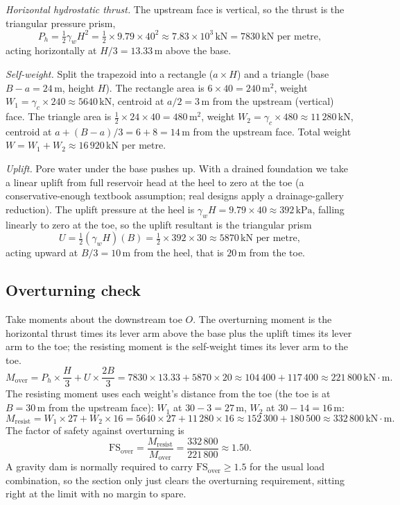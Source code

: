 \emph{Horizontal hydrostatic thrust.} The upstream face is vertical, so
the thrust is the triangular pressure prism,
\[
P_h = \tfrac12 \gamma_w H^2
= \tfrac12 \times 9.79 \times 40^2
\approx 7.83 \times 10^3\,\text{kN}
= 7830\,\text{kN per metre},
\]
acting horizontally at $H/3 = 13.33\,\si{\meter}$ above the base.

\emph{Self-weight.} Split the trapezoid into a rectangle ($a \times H$)
and a triangle (base $B - a = 24\,\si{\meter}$, height $H$). The
rectangle area is $6 \times 40 = 240\,\text{m}^2$, weight $W_1 =
\gamma_c \times 240 \approx 5640\,\text{kN}$, centroid at $a/2 = 3\,
\si{\meter}$ from the upstream (vertical) face. The triangle area is
$\tfrac12 \times 24 \times 40 = 480\,\text{m}^2$, weight $W_2 =
\gamma_c \times 480 \approx 11\,280\,\text{kN}$, centroid at $a + (B -
a)/3 = 6 + 8 = 14\,\si{\meter}$ from the upstream face. Total weight
$W = W_1 + W_2 \approx 16\,920\,\text{kN}$ per metre.

\emph{Uplift.} Pore water under the base pushes up. With a drained
foundation we take a linear uplift from full reservoir head at the heel
to zero at the toe (a conservative-enough textbook assumption; real
designs apply a drainage-gallery reduction). The uplift pressure at the
heel is $\gamma_w H = 9.79 \times 40 \approx 392\,\text{kPa}$, falling
linearly to zero at the toe, so the uplift resultant is the triangular
prism
\[
U = \tfrac12 (\gamma_w H)(B)
= \tfrac12 \times 392 \times 30
\approx 5870\,\text{kN per metre},
\]
acting upward at $B/3 = 10\,\si{\meter}$ from the heel, that is $20\,
\si{\meter}$ from the toe.

\subsection{Overturning check}

Take moments about the downstream toe $O$. The overturning moment is the
horizontal thrust times its lever arm above the base plus the uplift
times its lever arm to the toe; the resisting moment is the self-weight
times its lever arm to the toe.
\[
M_{\text{over}} = P_h \times \frac{H}{3} + U \times \frac{2B}{3}
= 7830 \times 13.33 + 5870 \times 20
\approx 104\,400 + 117\,400
\approx 221\,800\,\text{kN}\cdot\text{m}.
\]
The resisting moment uses each weight's distance from the toe (the toe is
at $B = 30\,\si{\meter}$ from the upstream face): $W_1$ at $30 - 3 = 27\,
\si{\meter}$, $W_2$ at $30 - 14 = 16\,\si{\meter}$:
\[
M_{\text{resist}} = W_1 \times 27 + W_2 \times 16
= 5640 \times 27 + 11\,280 \times 16
\approx 152\,300 + 180\,500
\approx 332\,800\,\text{kN}\cdot\text{m}.
\]
The factor of safety against overturning is
\[
\mathrm{FS}_{\text{over}} = \frac{M_{\text{resist}}}{M_{\text{over}}}
= \frac{332\,800}{221\,800}
\approx 1.50.
\]
A gravity dam is normally required to carry $\mathrm{FS}_{\text{over}}
\ge 1.5$ for the usual load combination, so the section only just clears
the overturning requirement, sitting right at the limit with no margin to
spare.

